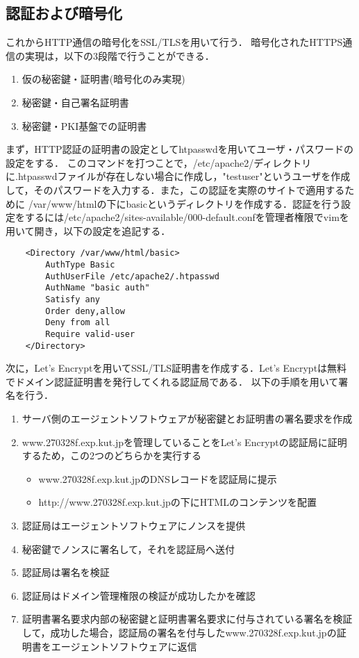 \documentclass[divpdfmx]{jlreq}
\begin{document}
\subsection{認証および暗号化}
これからHTTP通信の暗号化をSSL/TLSを用いて行う．
暗号化されたHTTPS通信の実現は，以下の3段階で行うことができる．
\begin{enumerate}
    \item 仮の秘密鍵・証明書(暗号化のみ実現)
    \item 秘密鍵・自己署名証明書
    \item 秘密鍵・PKI基盤での証明書
\end{enumerate}
まず，HTTP認証の証明書の設定としてhtpasswdを用いてユーザ・パスワードの設定をする．
このコマンドを打つことで，/etc/apache2/ディレクトリに.htpasswdファイルが存在しない場合に作成し，"testuser"というユーザを作成して，そのパスワードを入力する．また，この認証を実際のサイトで適用するために
/var/www/htmlの下にbasicというディレクトリを作成する．認証を行う設定をするには/etc/apache2/sites-available/000-default.confを管理者権限でvimを用いて開き，以下の設定を追記する．
\begin{lstlisting}
    <Directory /var/www/html/basic>
        AuthType Basic
        AuthUserFile /etc/apache2/.htpasswd
        AuthName "basic auth"
        Satisfy any
        Order deny,allow
        Deny from all
        Require valid-user
    </Directory>
\end{lstlisting}
次に，Let's Encryptを用いてSSL/TLS証明書を作成する．Let's Encryptは無料でドメイン認証証明書を発行してくれる認証局である．
以下の手順を用いて署名を行う．
\begin{enumerate}
    \item サーバ側のエージェントソフトウェアが秘密鍵とお証明書の署名要求を作成
    \item www.270328f.exp.kut.jpを管理していることをLet's Encryptの認証局に証明するため，この2つのどちらかを実行する
    \begin{itemize}
        \item www.270328f.exp.kut.jpのDNSレコードを認証局に提示
        \item http://www.270328f.exp.kut.jpの下にHTMLのコンテンツを配置
    \end{itemize}
    \item 認証局はエージェントソフトウェアにノンスを提供
    \item 秘密鍵でノンスに署名して，それを認証局へ送付
    \item 認証局は署名を検証
    \item 認証局はドメイン管理権限の検証が成功したかを確認
    \item 証明書署名要求内部の秘密鍵と証明書署名要求に付与されている署名を検証して，成功した場合，認証局の署名を付与したwww.270328f.exp.kut.jpの証明書をエージェントソフトウェアに返信
\end{enumerate}
\end{document}
